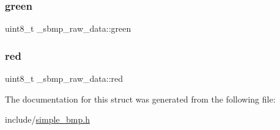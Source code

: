 \subsubsection{\texorpdfstring{green}{green}}
{\footnotesize\ttfamily uint8\+\_\+t \+\_\+sbmp\+\_\+raw\+\_\+data\+::green}

\mbox{\label{struct__sbmp__raw__data_a242c14e8cabe5016356aee032e25a7a3}} 
\subsubsection{\texorpdfstring{red}{red}}
{\footnotesize\ttfamily uint8\+\_\+t \+\_\+sbmp\+\_\+raw\+\_\+data\+::red}



The documentation for this struct was generated from the following file\+:\begin{DoxyCompactItemize}
\item 
include/\hyperlink{simple__bmp_8h}{simple\+\_\+bmp.\+h}\end{DoxyCompactItemize}
